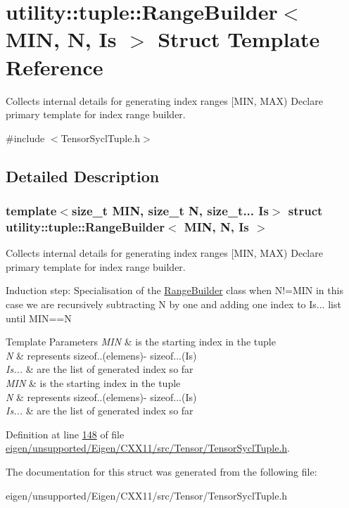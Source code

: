 \hypertarget{structutility_1_1tuple_1_1_range_builder}{}\section{utility\+:\+:tuple\+:\+:Range\+Builder$<$ M\+IN, N, Is $>$ Struct Template Reference}
\label{structutility_1_1tuple_1_1_range_builder}


Collects internal details for generating index ranges \mbox{[}M\+IN, M\+AX) Declare primary template for index range builder.  




{\ttfamily \#include $<$Tensor\+Sycl\+Tuple.\+h$>$}



\subsection{Detailed Description}
\subsubsection*{template$<$size\+\_\+t M\+IN, size\+\_\+t N, size\+\_\+t... Is$>$\newline
struct utility\+::tuple\+::\+Range\+Builder$<$ M\+I\+N, N, Is $>$}

Collects internal details for generating index ranges \mbox{[}M\+IN, M\+AX) Declare primary template for index range builder. 

Induction step\+: Specialisation of the \hyperlink{structutility_1_1tuple_1_1_range_builder}{Range\+Builder} class when N!=M\+IN in this case we are recursively subtracting N by one and adding one index to Is... list until M\+IN==N 
\begin{DoxyTemplParams}{Template Parameters}
{\em M\+IN} & is the starting index in the tuple \\
\hline
{\em N} & represents sizeof..(elemens)-\/ sizeof...(Is) \\
\hline
{\em Is...} & are the list of generated index so far\\
\hline
{\em M\+IN} & is the starting index in the tuple \\
\hline
{\em N} & represents sizeof..(elemens)-\/ sizeof...(Is) \\
\hline
{\em Is...} & are the list of generated index so far \\
\hline
\end{DoxyTemplParams}


Definition at line \hyperlink{eigen_2unsupported_2_eigen_2_c_x_x11_2src_2_tensor_2_tensor_sycl_tuple_8h_source_l00148}{148} of file \hyperlink{eigen_2unsupported_2_eigen_2_c_x_x11_2src_2_tensor_2_tensor_sycl_tuple_8h_source}{eigen/unsupported/\+Eigen/\+C\+X\+X11/src/\+Tensor/\+Tensor\+Sycl\+Tuple.\+h}.



The documentation for this struct was generated from the following file\+:\begin{DoxyCompactItemize}
\item 
eigen/unsupported/\+Eigen/\+C\+X\+X11/src/\+Tensor/\+Tensor\+Sycl\+Tuple.\+h\end{DoxyCompactItemize}
